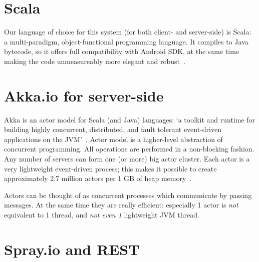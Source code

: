 %
%
%
%
%

\section{Scala}
\label{sec:scala}

Our language of choice for this system (for both client- and server-side) is Scala: a multi-paradigm, object-functional programming language. It compiles to Java bytecode, so it offers full compatibility with Android SDK, at the same time making the code unmeasureably more elegant and robust~\cite{Odersky:2008:Programming}.

\section{Akka.io for server-side}
\label{sec:akka}

Akka is an actor model for Scala (and Java) languages: `a toolkit and runtime for building highly concurrent, distributed, and fault tolerant event-driven applications on the JVM'~\cite{Akka:2013:Docs}. Actor model is a higher-level abstraction of concurrent programming. All operations are performed in a non-blocking fashion. Any number of servers can form one (or more) big actor cluster. Each actor is a very lightweight event-driven process; this makes it possible to create approximately 2.7 million actors per 1 GB of heap memory~\cite{Akka:2013:Docs}.

Actors can be thought of as concurrent processes which communicate by passing messages. At the same time they are really efficient: especially 1 actor is \emph{not} equivalent to 1 thread, and \emph{not even 1} lightweight JVM thread.

\section{Spray.io and REST}
\label{sec:theory-spray}

